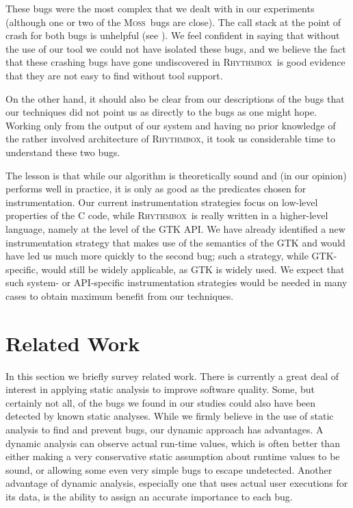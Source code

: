 \documentclass[draft]{sig-alternate}
\newcommand{\moss}{\textsc{Moss}\xspace}
\newcommand{\rhythmbox}{\textsc{Rhythmbox}\xspace}
\begin{document}
These bugs were the most complex that we dealt with in 
our experiments (although one or two of the \moss\ bugs are close).  The
call stack at the point of crash for both bugs is unhelpful (see ).  We feel confident in saying that without the use of
our tool we could not have isolated these bugs, and we believe
 the fact that these crashing bugs have gone undiscovered in \rhythmbox\ is
good evidence that they are not easy to find without tool support.

On the other hand, it should also be clear from our descriptions of the bugs
that our techniques did not point us as directly to the bugs as one might hope.
Working only from the output of our system and having no prior knowledge of
the rather involved architecture of \rhythmbox, it took us considerable time
to understand these two bugs.  

The lesson is that while our algorithm is theoretically sound and (in
our opinion) performs well in practice, it is only as good as the
predicates chosen for instrumentation.  Our current instrumentation
strategies focus on low-level properties of the C code, while \rhythmbox\
is really written in a higher-level language, namely at the level of
the GTK API.  We have already identified a new instrumentation strategy
that makes use of the semantics of the GTK and would have led us
much more quickly to the second bug; such a strategy, while GTK-specific,
would still be widely applicable, as GTK is widely used.  We expect
that such system- or API-specific instrumentation strategies would be
needed in many cases to obtain maximum benefit from our techniques.


\section{Related Work}
\label{sec:related-work}

In this section we briefly survey related work. There is currently a great
deal of interest in applying static analysis to improve software quality.  Some,
but certainly not all, of the bugs we found in our studies could also have
been detected by known static analyses.  While we firmly believe in
the use of static analysis to find and prevent bugs, our dynamic approach has
advantages. A dynamic analysis can observe actual run-time values, which is often
better than either making a very conservative static assumption about runtime
values to be sound, or allowing some even very simple bugs to escape undetected.
Another advantage of dynamic analysis, especially one that uses actual user
executions for its data, is the ability to assign an accurate importance to each
bug.
  
\end{document}
